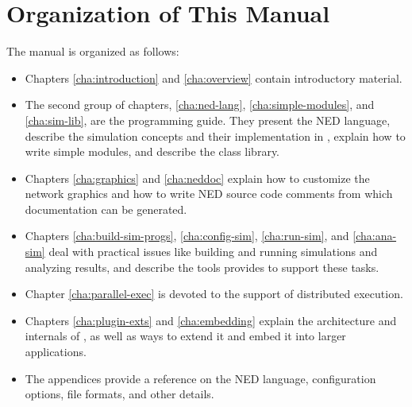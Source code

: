 \section{Organization of This Manual}
\label{sec:introduction:organization-of-this-manual}

The manual is organized as follows:

\begin{itemize}
  \item Chapters \ref{cha:introduction} and \ref{cha:overview}
    contain introductory material.
  \item The second group of chapters, \ref{cha:ned-lang}, \ref{cha:simple-modules}, and
    \ref{cha:sim-lib}, are the programming guide. They present the
    NED language, describe the simulation concepts
    and their implementation in {\opp}, explain how to write
    simple modules, and describe the class library.
  \item Chapters \ref{cha:graphics} and \ref{cha:neddoc} explain how to customize
    the network graphics and how to write NED source code comments
    from which documentation can be generated.
  \item Chapters \ref{cha:build-sim-progs},
    \ref{cha:config-sim}, \ref{cha:run-sim}, and \ref{cha:ana-sim} deal with
    practical issues like building and running simulations and analyzing results, and
    describe the tools {\opp} provides to support these tasks.
  \item Chapter \ref{cha:parallel-exec} is devoted to the support
    of distributed execution.
  \item Chapters \ref{cha:plugin-exts} and \ref{cha:embedding}
    explain the architecture and internals of {\opp}, as well as
    ways to extend it and embed it into larger applications.
  \item The appendices provide a reference on the NED language,
    configuration options, file formats, and other details.
\end{itemize}


%
%


